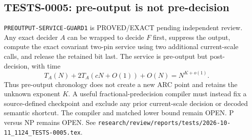 \subsection*{TESTS-0005: pre-output is not pre-decision}
\texttt{PREOUTPUT-SERVICE-GUARD1} is PROVED/EXACT pending independent
review.  Any exact decider $A$ can be wrapped to decide $F$ first, suppress
the output, compute the exact covariant two-pin service using two additional
current-scale calls, and release the retained bit last.  The service is
pre-output but post-decision, with time
\[
 T_A(N)+2T_A(cN+O(1))+O(N)=N^{K+o(1)}.
\]
Thus pre-output chronology does not create a new ARC point and retains the
unknown exponent $K$.  A useful fractional-predecision compiler must instead
fix a source-defined checkpoint and exclude any prior current-scale decision
or decoded semantic shortcut.  The compiler and matched lower bound remain
OPEN.  P versus NP remains OPEN.  See
\texttt{research/review/reports/tests/2026-10-11\_1124\_TESTS-0005.tex}.
